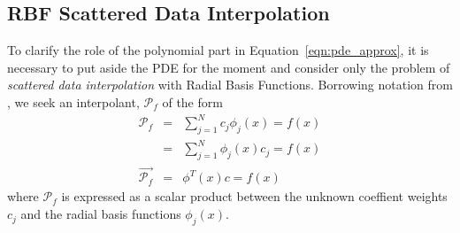 \documentclass{report}
\begin{document}
{\subsection{RBF Scattered Data Interpolation}
To clarify the role of the polynomial part in Equation~\ref{eqn:pde_approx}, it is necessary to
put aside the PDE for the moment and consider only the problem of \emph{scattered data 
interpolation} with Radial Basis Functions. Borrowing notation from \cite{Fasshauer2007, Iske2004}, 
we seek an interpolant, $\mathcal{P}_f$ of the form
\begin{eqnarray*}
\mathcal{P}_f  & = & \sum_{j=1}^{N} c_{j}  \phi_j(x) = f(x) \\
			& = & \sum_{j=1}^{N} \phi_j(x) c_{j} = f(x) \\
\vec{\mathcal{P}_f} & = & {\phi}^T(x) c = f(x)
\end{eqnarray*}
where $\mathcal{P}_f$ is expressed as a scalar product between the unknown coeffient weights $c_j$ and the radial basis functions $\phi_j(x)$.

}
\end{document}
